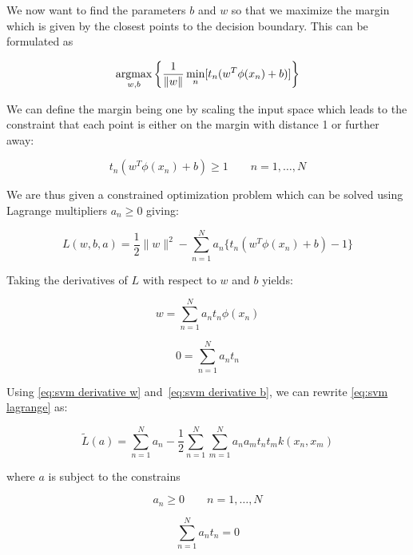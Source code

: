 We now want to find the parameters $b$ and $w$ so that we maximize the margin which is given by the closest points to the decision boundary. This can be formulated as

\begin{equation}
	\argmax_{w, b} \left\{ \frac{1}{\|w\|} \min_n [ t_n (w^T \phi(x_n) + b) ] \right\}
\end{equation}

We can define the margin being one by scaling the input space which leads to the constraint that each point is either on the margin with distance 1 or further away:

\begin{equation}
	t_n (w^T \phi(x_n) + b) \geq 1 \quad\quad n = 1, \ldots, N
\end{equation}

We are thus given a constrained optimization problem which can be solved using Lagrange multipliers $a_n \geq 0$ giving:

\begin{equation}
	L(w, b, a) = \frac{1}{2} \|w\|^2 - \sum_{n=1}^N a_n \{ t_n (w^T \phi(x_n) + b) -1 \}
	\label{eq:svm lagrange}
\end{equation}

Taking the derivatives of $L$ with respect to $w$ and $b$ yields:

\begin{equation}
	w = \sum_{n=1}^N a_n t_n \phi(x_n)
	\label{eq:svm derivative w}
\end{equation}

\begin{equation}
	0 = \sum_{n=1}^N a_n t_n
	\label{eq:svm derivative b}
\end{equation}

Using \eqref{eq:svm derivative w} and~\ref{eq:svm derivative b}, we can rewrite \eqref{eq:svm lagrange} as:

\begin{equation}
	\widetilde{L}(a) = \sum_{n=1}^N a_n - \frac{1}{2} \sum_{n=1}^N \sum_{m=1}^N a_n a_m t_n t_m k(x_n, x_m)
\end{equation}

where $a$ is subject to the constrains

\begin{equation}
	a_n \geq 0 \quad \quad n = 1, \ldots, N
\end{equation}

\begin{equation}
	\sum_{n=1}^N a_n t_n = 0
\end{equation}

